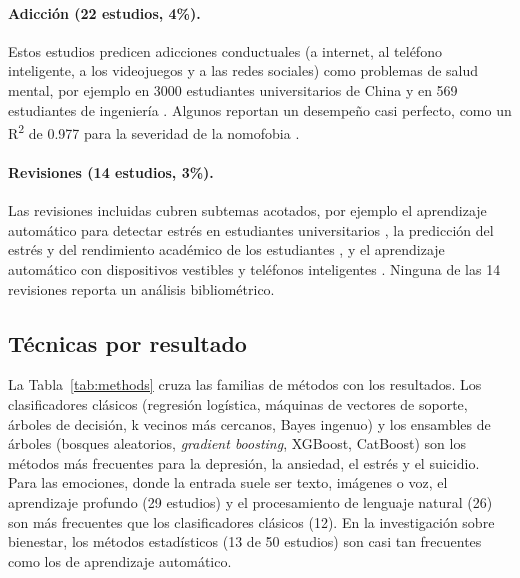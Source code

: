 \documentclass[11pt,a4paper]{article}
\begin{document}
\paragraph{Adicción (22 estudios, 4\%).} Estos estudios predicen adicciones conductuales (a internet, al teléfono inteligente, a los videojuegos y a las redes sociales) como problemas de salud mental, por ejemplo en 3000 estudiantes universitarios de China \cite{D063} y en 569 estudiantes de ingeniería \cite{I665}. Algunos reportan un desempeño casi perfecto, como un R\textsuperscript{2} de 0.977 para la severidad de la nomofobia \cite{I344}.

\paragraph{Revisiones (14 estudios, 3\%).} Las revisiones incluidas cubren subtemas acotados, por ejemplo el aprendizaje automático para detectar estrés en estudiantes universitarios \cite{I192}, la predicción del estrés y del rendimiento académico de los estudiantes \cite{I501}, y el aprendizaje automático con dispositivos vestibles y teléfonos inteligentes \cite{S049}. Ninguna de las 14 revisiones reporta un análisis bibliométrico.

\subsection{Técnicas por resultado}

La Tabla~\ref{tab:methods} cruza las familias de métodos con los resultados. Los clasificadores clásicos (regresión logística, máquinas de vectores de soporte, árboles de decisión, k vecinos más cercanos, Bayes ingenuo) y los ensambles de árboles (bosques aleatorios, \emph{gradient boosting}, XGBoost, CatBoost) son los métodos más frecuentes para la depresión, la ansiedad, el estrés y el suicidio. Para las emociones, donde la entrada suele ser texto, imágenes o voz, el aprendizaje profundo (29 estudios) y el procesamiento de lenguaje natural (26) son más frecuentes que los clasificadores clásicos (12). En la investigación sobre bienestar, los métodos estadísticos (13 de 50 estudios) son casi tan frecuentes como los de aprendizaje automático.
\end{document}
